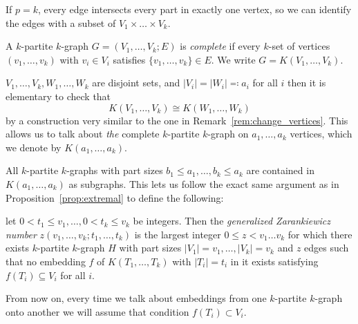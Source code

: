 \begin{remark}
    If $p=k$, every edge intersects every part in exactly one vertex,
    so we can identify the edges with a subset of $ V_1 \times \dots \times V_k$.
\end{remark}

\begin{definition}
    A $k$-partite $k$-graph $G = (V_1, \dots, V_k; E)$ is \emph{complete}
    if every $k$-set of vertices $(v_1, \dots, v_k)$ with $v_i \in V_i$
    satisfies $\{v_1, \dots, v_k\} \in E$.
    We write $G = K(V_1, \dots, V_k)$.
\end{definition}

\begin{remark}
    $V_1, \dots, V_k, W_1, \dots, W_k$ are disjoint sets,
    and $|V_i| = |W_i| \eqqcolon a_i$ for all $i$ then it is elementary to check that
    \[
        K(V_1, \dots, V_k) \cong K(W_1, \dots, W_k)
    \]
    by a construction very similar to the one in Remark~\ref{rem:change_vertices}.
    This allows us to talk about \emph{the} complete $k$-partite $k$-graph on
    $a_1, \dots, a_k$ vertices, which we denote by $K(a_1, \dots, a_k)$.
\end{remark}

\begin{remark}
    All $k$-partite $k$-graphs with part sizes $b_1 \leq a_1, \dots, b_k \leq a_k$
    are contained in $K(a_1, \dots, a_k)$ as subgraphs.
    This lets us follow the exact same argument as in Proposition~\ref{prop:extremal}
    to define the following:
\end{remark}

\begin{definition}\label{def:zarankiewicz}
    let $0 < t_1 \leq v_1, \dots, 0 < t_k \leq v_k$ be integers.
    Then the \emph{generalized Zarankiewicz number} $z(v_1, \dots, v_k; t_1, \dots, t_k)$
    is the largest integer $0 \leq z < v_1  \dots v_k$ for which there exists $k$-partite $k$-graph
    $H$ with part sizes $ |V_1| = v_1, \dots, |V_k| = v_k$ and $z$ edges
    such that no embedding $f$ of $K(T_1, \dots, T_k)$ with $|T_i| = t_i$ in it exists
    satisfying $f(T_i) \subseteq V_i$ for all $i$.
\end{definition}

From now on, every time we talk about embeddings from one $k$-partite $k$-graph
onto another we will assume that condition $f(T_i) \subset V_i$.

